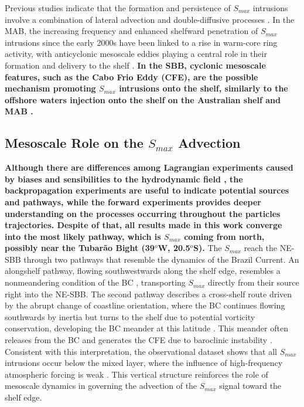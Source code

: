 \documentclass[draft]{agujournal2019}
\begin{document}
Previous studies indicate that the formation and persistence of \textit{$S_{max}$} intrusions involve a combination of lateral advection and double-diffusive processes \cite{Lentz2003, gawarkiewicz2022increasing, silva2023inventory, gawarkiewicz2025mapping}. In the MAB, the increasing frequency and enhanced shelfward penetration of \textit{$S_{max}$} intrusions since the early 2000s have been linked to a rise in warm-core ring activity, with anticyclonic mesoscale eddies playing a central role in their formation and delivery to the shelf \cite{gangopadhyay2019observed, silver2023increased}. \textbf{In the SBB, cyclonic mesoscale features, such as the Cabo Frio Eddy (CFE), are the possible mechanism promoting \textit{$S_{max}$} intrusions onto the shelf, similarly to the offshore waters injection onto the shelf on the Australian shelf \cite{Malan2020} and MAB \cite{gawarkiewicz2025mapping}.}

\subsection{Mesoscale Role on the \textit{$S_{max}$} Advection} 
\label{subsec:mesoscale_advection}

\textbf{Although there are differences among Lagrangian experiments caused by biases and sensibilities to the hydrodynamic field \cite<further discussed on>{reijnders2026stability}, the backpropagation experiments are useful to indicate potential sources and pathways, while the forward experiments provides deeper understanding on the processes occurring throughout the particles trajectories. Despite of that, all results made in this work converge into the most likely pathway, which is \textit{$S_{max}$} coming from north, possibly near the Tubarão Bight (39$^o$W, 20.5$^o$S).} The \textit{$S_{max}$} reach the NE-SBB through two pathways that resemble the dynamics of the Brazil Current. An alongshelf pathway, flowing southwestwards along the shelf edge, resembles a nonmeandering condition of the BC \cite{silveira2008}, transporting \textit{$S_{max}$} directly from their source right into the NE-SBB. The second pathway describes a cross-shelf route driven by the abrupt change of coastline orientation, where the BC continues flowing southwards by inertia but turns to the shelf due to potential vorticity conservation, developing the BC meander at this latitude \cite{mascarenhas1971study,silveira2008}. This meander often releases from the BC and generates the CFE due to baroclinic instability \cite{silveira2008,luko2022,rocha2022,uchoa2023,silveira2023}. Consistent with this interpretation, the observational dataset shows that all \textit{$S_{max}$} intrusions occur below the mixed layer, where the influence of high-frequency atmospheric forcing is weak \cite{giunta2022ocean}. This vertical structure reinforces the role of mesoscale dynamics in governing the advection of the \textit{$S_{max}$} signal toward the shelf edge.
\end{document}
